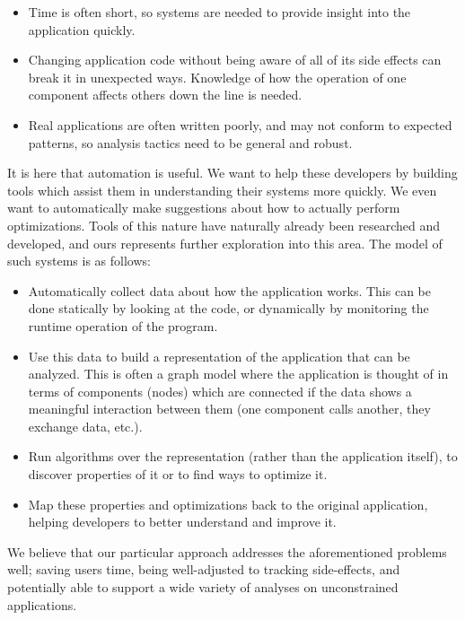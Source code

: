 \documentclass[msc,oneside]{ubcthesis}
\begin{document}
\begin{itemize}
\item Time is often short, so systems are needed to provide insight into the application quickly.
\item Changing application code without being aware of all of its side effects can break it in unexpected ways. Knowledge of how the operation of one component affects others down the line is needed.
\item Real applications are often written poorly, and may not conform to expected patterns, so analysis tactics need to be general and robust.
\end{itemize}

It is here that automation is useful. We want to help these developers by building tools which assist them in understanding their systems more quickly. We even want to automatically make suggestions about how to actually perform optimizations. Tools of this nature have naturally already been researched and developed, and ours represents further exploration into this area. The model of such systems is as follows:\\

\begin{itemize}
\item Automatically collect data about how the application works. This can be done statically by looking at the code, or dynamically by monitoring the runtime operation of the program.
\item Use this data to build a representation of the application that can be analyzed. This is often a graph model where the application is thought of in terms of components (nodes) which are connected if the data shows a meaningful interaction between them (one component calls another, they exchange data, etc.).
\item Run algorithms over the representation (rather than the application itself), to discover properties of it or to find ways to optimize it.
\item Map these properties and optimizations back to the original application, helping developers to better understand and improve it.
\end{itemize}

We believe that our particular approach addresses the aforementioned problems well; saving users time, being well-adjusted to tracking side-effects, and potentially able to support a wide variety of analyses on unconstrained applications.

%
%
	
\end{document}

